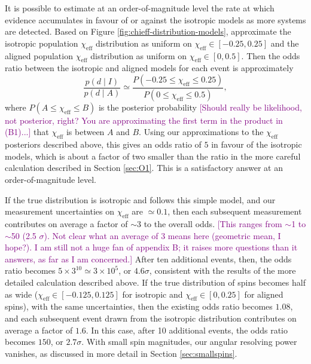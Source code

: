 \documentclass[modern,linenumbers]{aastex61}
\newcommand{\chieff}{\chi_\mathrm{eff}}
\newcommand{\ilya}[1]{\textcolor{purple}{#1}}
\begin{document}
It is possible to estimate at an order-of-magnitude level the rate at
which evidence accumulates in favour of or against the isotropic
models as more systems are detected.  Based on Figure
\ref{fig:chieff-distribution-models}, approximate the isotropic
population $\chieff$ distribution as uniform on
$\chieff \in \left[ -0.25, 0.25 \right]$ and the aligned population
$\chieff$ distribution as uniform on
$\chieff \in \left[0, 0.5\right]$.  Then the odds ratio between the
isotropic and aligned models for each event is approximately
\begin{equation}
  \label{eq:approx-odds}
  \frac{p\left( d \mid I \right)}{p\left( d \mid A \right)} \simeq
  \frac{P\left( -0.25 \leq \chieff \leq 0.25 \right)}{P\left( 0 \leq \chieff \leq 0.5 \right) },
\end{equation}
where $P\left( A \leq \chieff \leq B \right)$ is the posterior
probability \ilya{[Should really be likelihood, not posterior, right?  You are approximating the first term in the product in (B1)...]} that $\chieff$ is between $A$ and $B$.  Using our
approximations to the $\chieff$ posteriors described above, this gives
an odds ratio of $5$ in favour of the isotropic models, which is about
a factor of two smaller than the ratio in the more careful calculation
described in Section \ref{sec:O1}.  This is a satisfactory answer at
an order-of-magnitude level.

If the true distribution is isotropic and follows this simple model,
and our measurement uncertainties on $\chieff$ are $\simeq 0.1$, then
each subsequent measurement contributes on average a factor of
$\sim 3$ to the overall odds. \ilya{[This ranges from $\sim$1 to $\sim$50 (2.5 $\sigma$).  Not clear what an average of 3 means here (geometric mean, I hope?).  I am still not a huge fan of appendix B; it raises more questions than it answers, as far as I am concerned.]}  After ten additional events, then, the
odds ratio becomes $5 \times 3^{10} \simeq 3 \times 10^{5}$, or
$4.6 \sigma$, consistent with the results of the more detailed
calculation described above.  If the true distribution of spins
becomes half as wide ($\chieff \in [-0.125, 0.125]$ for isotropic and
$\chieff \in [0, 0.25]$ for aligned spins), with the same
uncertainties, then the existing odds ratio becomes $1.08$, and each
subsequent event drawn from the isotropic distribution contributes on
average a factor of $1.6$.  In this case, after 10 additional events,
the odds ratio becomes $150$, or $2.7\sigma$.  With small spin
magnitudes, our angular resolving power vanishes, as discussed in more
detail in Section \ref{sec:smallspins}.
\end{document}
